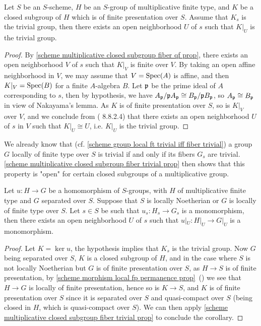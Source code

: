 \begin{proposition}\label{scheme multiplicative closed subgroup fiber trivial prop}
Let $S$ be an $S$-scheme, $H$ be an $S$-group of multiplicative finite type, and $K$ be a closed subgroup of $H$ which is of finite presentation over $S$. Assume that $K_s$ is the trivial group, then there exists an open neighborhood $U$ of $s$ such that $K|_U$ is the trivial group.
\end{proposition}
\begin{proof}
By \cref{scheme multiplicative closed subgroup fiber qf prop}, there exists an open neighborhood $V$ of $s$ such that $K|_V$ is finite over $V$. By taking an open affine neighborhood in $V$, we may assume that $V=\mathrm{Spec}(A)$ is affine, and then $K|_V=\mathrm{Spec}(B)$ for a finite $A$-algebra $B$. Let $\mathfrak{p}$ be the prime ideal of $A$ corresponding to $s$, then by hypothesis, we have $A_{\mathfrak{p}}/\mathfrak{p} A_{\mathfrak{p}}\cong B_{\mathfrak{p}}/\mathfrak{p} B_{\mathfrak{p}}$, so $A_{\mathfrak{p}}\cong B_{\mathfrak{p}}$ in view of Nakayama's lemma. As $K$ is of finite presentation over $S$, so is $K|_V$ over $V$, and we conclude from (\cite{EGA4-3} 8.8.2.4) that there exists an open neighborhood $U$ of $s$ in $V$ such that $K|_U\cong U$, i.e. $K|_U$ is the trivial group.
\end{proof}

\begin{remark}
We already know that (cf. \cref{scheme group local ft trivial iff fiber trivial}) a group $G$ locally of finite type over $S$ is trivial if and only if its fibers $G_s$ are trivial. \cref{scheme multiplicative closed subgroup fiber trivial prop} then shows that this property is "open" for certain closed subgroups of a multiplicative group.
\end{remark}

\begin{corollary}\label{scheme group morphism from multiplicative mono locus open}
Let $u:H\to G$ be a homomorphism of $S$-groups, with $H$ of multiplicative finite type and $G$ separated over $S$. Suppose that $S$ is locally Noetherian or $G$ is locally of finite type over $S$. Let $s\in S$ be such that $u_s:H_s\to G_s$ is a monomorphism, then there exists an open neighborhood $U$ of $s$ such that $u|_U:H|_U\to G|_U$ is a monomorphism.
\end{corollary}
\begin{proof}
Let $K=\ker u$, the hypothesis implies that $K_s$ is the trivial group. Now $G$ being separated over $S$, $K$ is a closed subgroup of $H$, and in the case where $S$ is not locally Noetherian but $G$ is of finite presentation over $S$, as $H\to S$ is of finite presentation, by \cref{scheme morphism local fp permanence prop}~() we see that $H\to G$ is locally of finite presentation, hence so is $K\to S$, and $K$ is of finite presentation over $S$ since it is separated over $S$ and quasi-compact over $S$ (being closed in $H$, which is quasi-compact over $S$). We can then apply \cref{scheme multiplicative closed subgroup fiber trivial prop} to conclude the corollary.
\end{proof}

